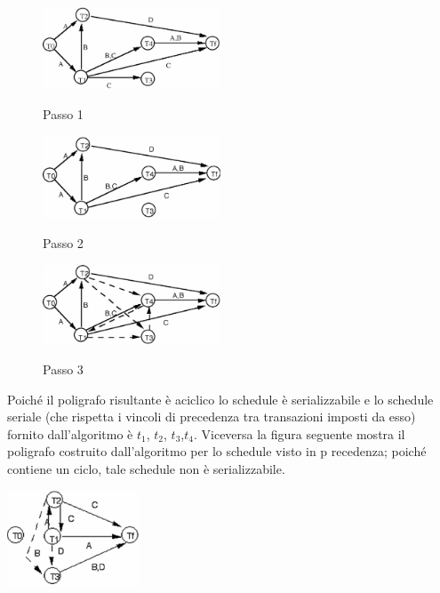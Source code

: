 \begin{center}
\begin{figure}[h!]
\centering
\includegraphics[width=200px]{img_6_3_2(1).eps}

Passo 1
\end{figure}

\begin{figure}[h!]
\centering
\includegraphics[width=200px]{img_6_3_2(2).eps}

Passo 2

\end{figure}

\begin{figure}[h!]
\centering
\includegraphics[width=200px]{img_6_3_2(3).eps}

Passo 3
\end{figure}
\end{center}

Poiché il poligrafo risultante è aciclico lo schedule è serializzabile e lo schedule seriale (che rispetta
i vincoli di precedenza tra transazioni imposti da esso) fornito dall'algoritmo è $t_1$, $t_2$, $t_3$,$t_4$.
Viceversa la figura seguente mostra il poligrafo costruito dall'algoritmo per lo schedule visto in
p recedenza; poiché contiene un ciclo, tale schedule non è serializzabile.
\begin{center}
 \includegraphics[width=150px]{img_6_3_2(4).eps}
\end{center}


